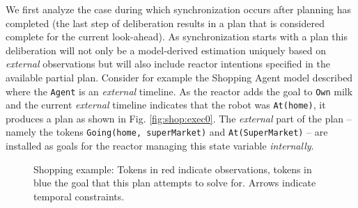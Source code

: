 We first analyze the case during which synchronization occurs after
planning has completed (\ie the last step of deliberation results in a
plan that is considered complete for the current look-ahead). As
synchronization starts with a plan %
this deliberation will not only be a model-derived estimation uniquely
based on {\em external} observations but will also include reactor
intentions specified in the available partial plan. Consider for
example the Shopping Agent model described where the \texttt{Agent} is
an {\em external} timeline. As the reactor adds the goal to
\texttt{Own} milk and the current {\em external} timeline indicates
that the robot was \texttt{At(home)}, it produces a plan as shown in
Fig. \ref{fig:shop:exec0}. The {\em external} part of the plan --
namely the tokens \texttt{Going(home, superMarket)} and
\texttt{At(SuperMarket)} -- are installed as goals for the reactor
managing this state variable {\em internally}.

\begin{figure}[!htb]
  \centering
    \caption{\small Shopping example: Tokens in red indicate
      observations, tokens in blue the goal that this plan attempts to
      solve for. Arrows indicate temporal constraints. }
  \label{fig:shop:exec}
\end{figure}


